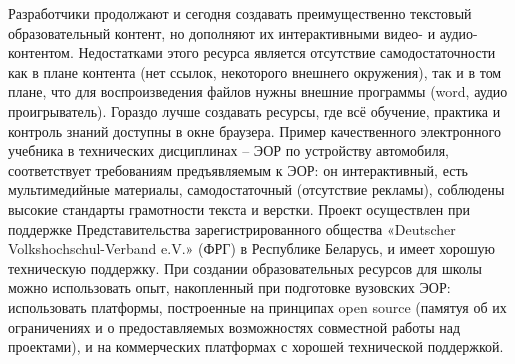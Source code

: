 Разработчики продолжают и сегодня создавать преимущественно текстовый образовательный контент, но дополняют их интерактивными видео- и аудио- контентом\cite{opk}. Недостатками этого ресурса является отсутствие самодостаточности как в плане контента (нет ссылок, некоторого внешнего окружения), так и в том плане, что для воспроизведения файлов нужны внешние программы (word, аудио проигрыватель). Гораздо лучше создавать ресурсы, где всё обучение, практика и контроль знаний доступны в окне браузера.
Пример качественного электронного учебника в технических дисциплинах – ЭОР по устройству автомобиля\cite{automobile}, соответствует требованиям предъявляемым к ЭОР: он интерактивный, есть мультимедийные материалы, самодостаточный (отсутствие рекламы), соблюдены высокие стандарты грамотности текста и верстки. Проект осуществлен при поддержке Представительства зарегистрированного общества «Deutscher Volkshochschul-Verband e.V.» (ФРГ) в Республике Беларусь, и имеет хорошую техническую поддержку.
При создании образовательных ресурсов для школы можно использовать опыт, накопленный при подготовке вузовских ЭОР: использовать платформы, построенные на принципах open source (памятуя об их ограничениях и о предоставляемых возможностях совместной работы над проектами), и  на коммерческих платформах с хорошей технической поддержкой.

